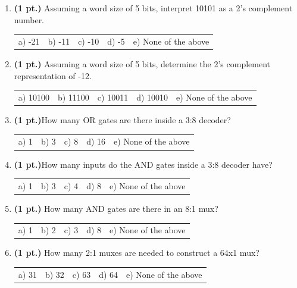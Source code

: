 \documentclass{article}
\begin{document}
\begin{enumerate}

\item {\bf (1 pt.)} Assuming a word size of 5 bits, interpret 10101 as a 2's complement
number.

\begin{tabular}{p{0.6in} p{0.6in} p{0.6in} p{0.6in} l}
a) -21 & b) -11 & c) -10 & d) -5 & e) None of the above
\end{tabular}

\item {\bf (1 pt.)} Assuming a word size of 5 bits, determine the 2's complement
representation of -12.

\begin{tabular}{p{0.6in} p{0.6in} p{0.6in} p{0.6in} l}
a) 10100 & b) 11100 & c) 10011 & d) 10010 & e) None of the above
\end{tabular}

\item {\bf (1 pt.)}How many OR gates are there inside a 3:8 decoder?

\begin{tabular}{p{0.6in} p{0.6in} p{0.6in} p{0.6in} l}
a) 1 & b) 3 & c) 8 & d) 16 & e) None of the above
\end{tabular}

\item {\bf (1 pt.)}How many inputs do the AND gates inside a 3:8 decoder have?

\begin{tabular}{p{0.6in} p{0.6in} p{0.6in} p{0.6in} l}
a) 1 & b) 3 & c) 4 & d) 8 & e) None of the above
\end{tabular}

\item {\bf (1 pt.)} How many AND gates are there in an 8:1 mux?

\begin{tabular}{p{0.6in} p{0.6in} p{0.6in} p{0.6in} l}
a) 1 & b) 2 & c) 3 & d) 8 & e) None of the above
\end{tabular}

\pagebreak
\item {\bf (1 pt.)} How many 2:1 muxes are needed to construct a 64x1 mux?

\begin{tabular}{p{0.6in} p{0.6in} p{0.6in} p{0.6in} l}
a) 31 & b) 32 & c) 63 & d) 64 & e) None of the above
\end{tabular}

\vspace{0.1in}


\end{enumerate}
\end{document}
